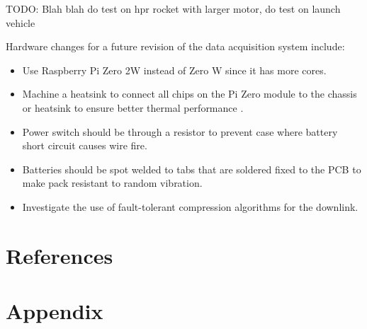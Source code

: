 \documentclass[draft]{report}
\begin{document}
TODO: Blah blah do test on hpr rocket with larger motor, do test on launch vehicle

Hardware changes for a future revision of the data acquisition system include:

\begin{itemize}
  \item Use Raspberry Pi Zero 2W instead of Zero W since it has more cores.
  \item Machine a heatsink to connect all chips on the Pi Zero module to the chassis or heatsink to ensure better thermal performance \cite{guertin2022raspberry}.
  \item Power switch should be through a resistor to prevent case where battery short circuit causes wire fire.
  \item Batteries should be spot welded to tabs that are soldered fixed to the PCB to make pack resistant to random vibration.
  \item Investigate the use of fault-tolerant compression algorithms for the downlink. %
\end{itemize}

\newpage

\section{References}

\printbibliography[heading=none]

\section{Appendix}
\end{document}
